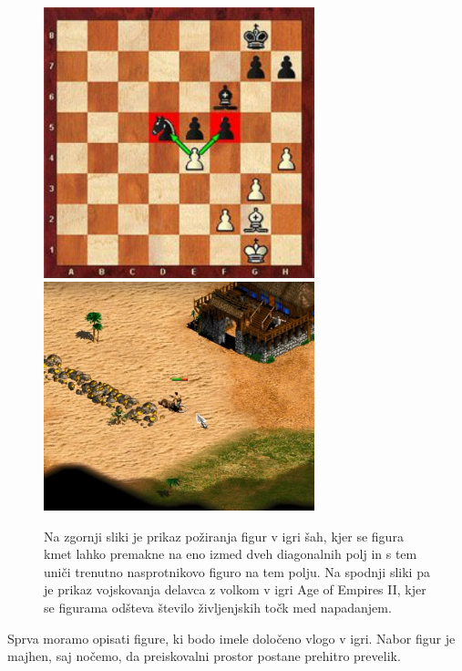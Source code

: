 \documentclass[a4paper, 12pt]{book}
\begin{document}
\begin{figure}[h]
	\begin{center}
		\includegraphics[width=0.7\textwidth]{photos/chess_capture.pdf}
		\includegraphics[width=0.7\textwidth]{photos/health_reduced.pdf}
	\end{center}
	\caption{Na zgornji sliki je prikaz požiranja figur v igri šah, kjer se figura kmet lahko premakne na eno izmed dveh diagonalnih polj in s tem uniči trenutno nasprotnikovo figuro na tem polju. 
		Na spodnji sliki pa je prikaz vojskovanja delavca z volkom v igri Age of Empires II, kjer se figurama odšteva število življenjskih točk med napadanjem.}
	\label{picPoziranjeFigur}
\end{figure}

Sprva moramo opisati figure, ki bodo imele določeno vlogo v igri. Nabor figur je majhen, saj nočemo, da preiskovalni prostor postane prehitro prevelik.
\end{document}
